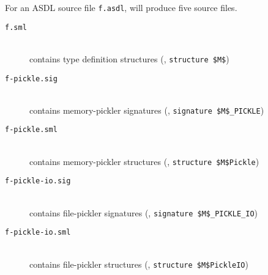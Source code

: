 For an ASDL source file \texttt{f.asdl}, \asdlgen{} will produce five \sml{} source files.
\begin{description}
  \item[\normalfont\texttt{f.sml}] \mbox{}\\
    contains type definition structures (\eg{},
    \lstinline[mathescape=true]@structure $M$@)
  \item[\normalfont\texttt{f-pickle.sig}] \mbox{}\\
    contains memory-pickler signatures (\eg{},
    \lstinline[mathescape=true]@signature $M$_PICKLE@)
  \item[\normalfont\texttt{f-pickle.sml}] \mbox{}\\
    contains memory-pickler structures (\eg{},
    \lstinline[mathescape=true]@structure $M$Pickle@)
  \item[\normalfont\texttt{f-pickle-io.sig}] \mbox{}\\
    contains file-pickler signatures (\eg{},
    \lstinline[mathescape=true]@signature $M$_PICKLE_IO@)
  \item[\normalfont\texttt{f-pickle-io.sml}] \mbox{}\\
    contains file-pickler structures (\eg{},
    \lstinline[mathescape=true]@structure $M$PickleIO@)
\end{description}%


